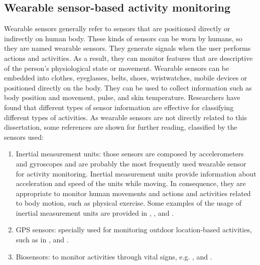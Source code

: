 \subsection{Wearable sensor-based activity monitoring}

Wearable sensors generally refer to sensors that are positioned directly or indirectly on human body. These kinds of sensors can be worn by humans, so they are named wearable sensors. They generate signals when the user performs actions and activities. As a result, they can monitor features that are descriptive of the person’s physiological state or movement. Wearable sensors can be embedded into clothes, eyeglasses, belts, shoes, wristwatches, mobile devices or positioned directly on the body. They can be used to collect information such as body position and movement, pulse, and skin temperature. Researchers have found that different types of sensor information are effective for classifying different types of activities. As wearable sensors are not directly related to this dissertation, some references are shown for further reading, classified by the sensors used:

\begin{enumerate}
 \item Inertial measurement units: those sensors are composed by accelerometers and gyroscopes and are probably the most frequently used wearable sensor for activity monitoring. Inertial measurement units provide information about acceleration and speed of the units while moving. In consequence, they are appropriate to monitor human movements and actions and activities related to body motion, such as physical exercise. Some  examples of the usage of inertial measurement units are provided in \cite{Bao2004}, \cite{Lukowicz2004}, \cite{Lee2002} and \cite{Mantyjarvi2001}.
 \item GPS sensors: specially used for monitoring outdoor location-based activities, such as in \cite{Patterson2003}, \cite{Ashbrook2003} and \cite{Liao2007a}.
 \item Biosensors: to monitor activities through vital signs, e.g. \cite{Sung2004}, \cite{Harms2008} and \cite{Finni2007}.
\end{enumerate}

